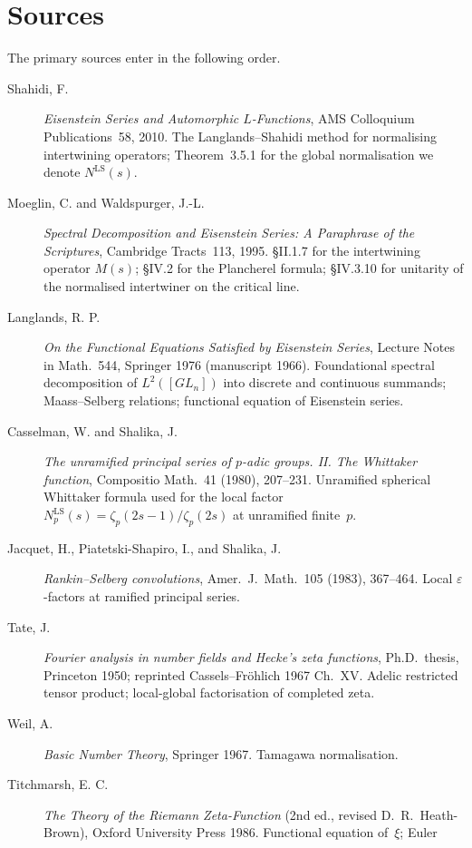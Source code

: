 \section{Sources}
\label{v4-arith:w6-c:LS:sources}

The primary sources enter in the following order.

\begin{description}
\item[Shahidi, F.] \emph{Eisenstein Series and Automorphic
\(L\)-Functions}, AMS Colloquium Publications~58, 2010. The
Langlands--Shahidi method for normalising intertwining operators;
Theorem~3.5.1 for the global normalisation we denote
\(N^{\mathrm{LS}}(s)\).
\item[Moeglin, C. and Waldspurger, J.-L.]
\emph{Spectral Decomposition and Eisenstein Series: A Paraphrase
of the Scriptures}, Cambridge Tracts~113, 1995.
\S II.1.7 for the intertwining operator \(M(s)\);
\S IV.2 for the Plancherel formula;
\S IV.3.10 for unitarity of the normalised intertwiner on the
critical line.
\item[Langlands, R. P.] \emph{On the Functional Equations
Satisfied by Eisenstein Series}, Lecture Notes in Math.~544,
Springer 1976 (manuscript 1966). Foundational spectral
decomposition of \(L^{2}([GL_{n}])\) into discrete and continuous
summands; Maass--Selberg relations; functional equation of
Eisenstein series.
\item[Casselman, W. and Shalika, J.] \emph{The unramified principal
series of \(p\)-adic groups. II. The Whittaker function},
Compositio Math.~41 (1980), 207--231. Unramified spherical
Whittaker formula used for the local factor
\(N^{\mathrm{LS}}_{p}(s)=\zeta_{p}(2s-1)/\zeta_{p}(2s)\) at
unramified finite~\(p\).
\item[Jacquet, H., Piatetski-Shapiro, I., and Shalika, J.]
\emph{Rankin--Selberg convolutions}, Amer.~J.~Math.~105 (1983),
367--464. Local \(\varepsilon\)-factors at ramified principal series.
\item[Tate, J.] \emph{Fourier analysis in number fields and Hecke's
zeta functions}, Ph.D.~thesis, Princeton 1950;
reprinted Cassels--Fr\"ohlich 1967 Ch.~XV. Adelic restricted
tensor product; local-global factorisation of completed zeta.
\item[Weil, A.] \emph{Basic Number Theory}, Springer 1967.
Tamagawa normalisation.
\item[Titchmarsh, E. C.] \emph{The Theory of the Riemann
Zeta-Function} (2nd ed., revised D.~R.~Heath-Brown), Oxford
University Press 1986. Functional equation of~\(\xi\); Euler

\end{description}
